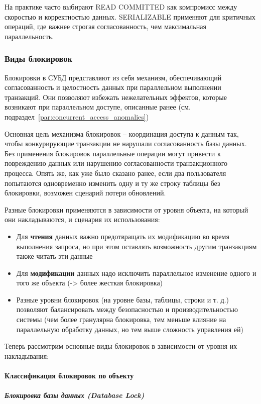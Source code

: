  На практике часто выбирают READ COMMITTED как компромисс между скоростью и корректностью данных. SERIALIZABLE применяют для критичных операций, где важнее строгая согласованность, чем максимальная параллельность.
 
 \subsubsection{Виды блокировок}
 
Блокировки в СУБД представляют из себя механизм, обеспечивающий согласованность и целостность данных при параллельном выполнении транзакций. Они позволяют избежать нежелательных эффектов, которые возникают при параллельном доступе, описанные ранее (см. подраздел~\ref{par:concurrent_access_anomalies})
 
 Основная цель механизма блокировок – координация доступа к данным так, чтобы конкурирующие транзакции не нарушали согласованность базы данных. Без применения блокировок параллельные операции могут привести к повреждению данных или нарушению согласованности транзакционного процесса. Опять же, как уже было сказано ранее, если два пользователя попытаются одновременно изменить одну и ту же строку таблицы без блокировки, возможен сценарий потери обновлений.
 
 Разные блокировки применяются в зависимости от уровня объекта, на который они накладываются, и сценария их использования:
 
 \begin{itemize}
     \item Для \textbf{чтения} данных важно предотвращать их модификацию во время выполнения запроса, но при этом оставлять возможность другим транзакциям также читать эти данные
     \item Для \textbf{модификации} данных надо исключить параллельное изменение одного и того же объекта (-> более жесткая блокировка)
    \item Разные уровни блокировок (на уровне базы, таблицы, строки и т. д.) позволяют балансировать между безопасностью и производительностью системы (чем более гранулярна блокировка, тем меньше влияние на параллельную обработку данных, но тем выше сложность управления ей) \autocite[ch.22]{ElmasriNavathe}
 \end{itemize}
 
 Теперь рассмотрим основные виды блокировок в зависимости от уровня их накладывания:
 
 \paragraph{Классификация блокировок по объекту}
 \subparagraph{Блокировка базы данных (Database Lock)} ~\\

